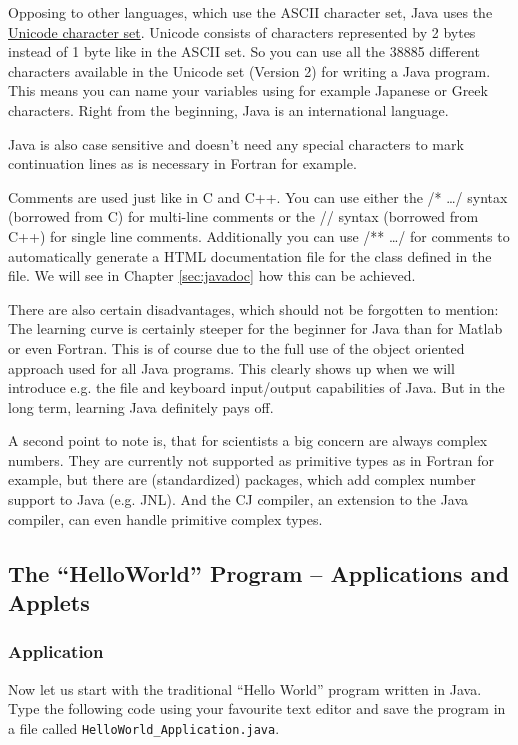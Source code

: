 Opposing to other languages, which use the ASCII character set, Java
uses the  \href{http://unicode.org}{Unicode character set}.
Unicode consists of characters represented
by 2 bytes instead of 1 byte like in the ASCII set. So you can use 
all the 38885 different
characters available in the Unicode set (Version 2) for writing a Java program.
This means you can name your variables using for example Japanese or Greek
characters. Right from the beginning, Java is an international language.

Java is also case sensitive and doesn't need any special characters
to mark continuation lines as is necessary in Fortran for example.

Comments are used just like in C and C++.
You can use either the /* \ldots */ syntax (borrowed from C) for
multi-line comments or the // syntax (borrowed from C++) for single
line comments. Additionally you can use /** \ldots */ for comments
to automatically generate a HTML documentation file for the class
defined in the file. We will see in Chapter \ref{sec:javadoc} 
how this can be achieved.
 
There are also certain disadvantages, which should not be forgotten
to mention: The learning curve is certainly steeper for the beginner
for Java than for Matlab or even Fortran. This is of course due
to the full use of the object oriented approach used for all Java
programs. This clearly shows up when we will introduce e.g. the
file and keyboard input/output capabilities of Java.
But in the long term, learning Java definitely pays off. 

A second point to note is, that for scientists a big concern are always
complex numbers. They are currently not supported as primitive types as 
in Fortran for example, but there are (standardized) packages, which
add complex number support to Java (e.g. JNL). And the CJ compiler,
an extension to the Java compiler, can even handle primitive complex types.


\subsection{The ``HelloWorld'' Program -- Applications and Applets}
\label{sec:HelloWorld}

\subsubsection{Application}

Now let us start with the traditional ``Hello World'' program written
in Java. Type the following code using your favourite text editor 
and save the program in a file called \verb|HelloWorld_Application.java|.

